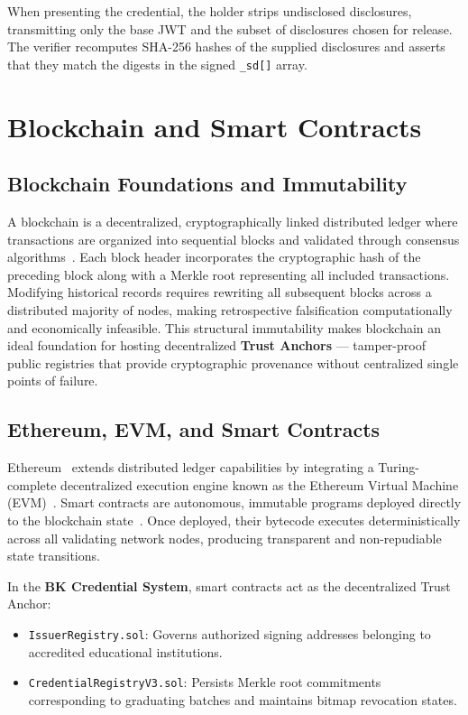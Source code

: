 When presenting the credential, the holder strips undisclosed disclosures, transmitting only the base JWT and the subset of disclosures chosen for release. The verifier recomputes SHA-256 hashes of the supplied disclosures and asserts that they match the digests in the signed \texttt{\_sd[]} array.

\section{Blockchain and Smart Contracts}

\subsection{Blockchain Foundations and Immutability}

A blockchain is a decentralized, cryptographically linked distributed ledger where transactions are organized into sequential blocks and validated through consensus algorithms~\cite{Cachin2017Blockchain,Narayanan2016BitcoinBook}. Each block header incorporates the cryptographic hash of the preceding block along with a Merkle root representing all included transactions. Modifying historical records requires rewriting all subsequent blocks across a distributed majority of nodes, making retrospective falsification computationally and economically infeasible. This structural immutability makes blockchain an ideal foundation for hosting decentralized \textbf{Trust Anchors} --- tamper-proof public registries that provide cryptographic provenance without centralized single points of failure.

\subsection{Ethereum, EVM, and Smart Contracts}

Ethereum~\cite{EthereumWhitepaper} extends distributed ledger capabilities by integrating a Turing-complete decentralized execution engine known as the Ethereum Virtual Machine (EVM)~\cite{EthereumYellowPaper}. Smart contracts are autonomous, immutable programs deployed directly to the blockchain state~\cite{Szabo1997SmartContracts}. Once deployed, their bytecode executes deterministically across all validating network nodes, producing transparent and non-repudiable state transitions.

In the \textbf{BK Credential System}, smart contracts act as the decentralized Trust Anchor:
\begin{itemize}
    \item \texttt{IssuerRegistry.sol}: Governs authorized signing addresses belonging to accredited educational institutions.
    \item \texttt{CredentialRegistryV3.sol}: Persists Merkle root commitments corresponding to graduating batches and maintains bitmap revocation states.
\end{itemize}

